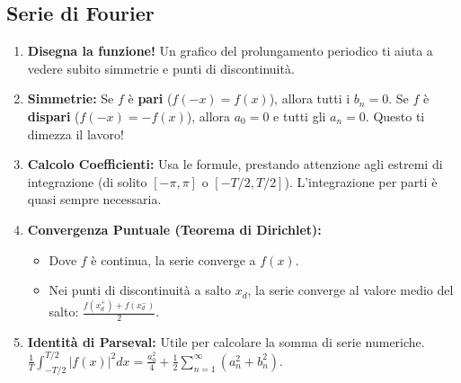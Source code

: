 \documentclass[a4paper, 12pt]{article}
\begin{document}
\subsection{Serie di Fourier}
\begin{strategia}
\begin{enumerate}
    \item \textbf{Disegna la funzione!} Un grafico del prolungamento periodico ti aiuta a vedere subito simmetrie e punti di discontinuità. 
    \item \textbf{Simmetrie:} Se $f$ è \textbf{pari} ($f(-x)=f(x)$), allora tutti i $b_n=0$. Se $f$ è \textbf{dispari} ($f(-x)=-f(x)$), allora $a_0=0$ e tutti gli $a_n=0$. Questo ti dimezza il lavoro! 
    \item \textbf{Calcolo Coefficienti:} Usa le formule, prestando attenzione agli estremi di integrazione (di solito $[-\pi, \pi]$ o $[-T/2, T/2]$). L'integrazione per parti è quasi sempre necessaria. 
    \item \textbf{Convergenza Puntuale (Teorema di Dirichlet):}
        \begin{itemize}
            \item Dove $f$ è continua, la serie converge a $f(x)$. 
            \item Nei punti di discontinuità a salto $x_d$, la serie converge al valore medio del salto: $\frac{f(x_d^+) + f(x_d^-)}{2}$. 
        \end{itemize}
    \item \textbf{Identità di Parseval:} Utile per calcolare la somma di serie numeriche. $\frac{1}{T} \int_{-T/2}^{T/2} |f(x)|^2 dx = \frac{a_0^2}{4} + \frac{1}{2} \sum_{n=1}^\infty (a_n^2 + b_n^2)$. 
\end{enumerate}
\end{strategia}
\end{document}

